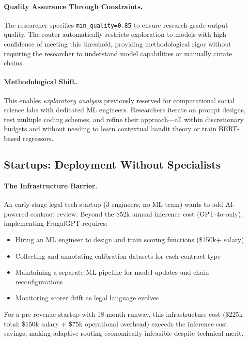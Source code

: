 \paragraph{Quality Assurance Through Constraints.}
The researcher specifies \texttt{min\_quality=0.85} to ensure research-grade output quality. The router automatically restricts exploration to models with high confidence of meeting this threshold, providing methodological rigor without requiring the researcher to understand model capabilities or manually curate chains.

\paragraph{Methodological Shift.} This enables \emph{exploratory analysis} previously reserved for computational social science labs with dedicated ML engineers. Researchers iterate on prompt designs, test multiple coding schemes, and refine their approach---all within discretionary budgets and without needing to learn contextual bandit theory or train BERT-based regressors.

\subsection{Startups: Deployment Without Specialists}

\paragraph{The Infrastructure Barrier.} An early-stage legal tech startup (3 engineers, no ML team) wants to add AI-powered contract review. Beyond the \$52k annual inference cost (GPT-4o-only), implementing FrugalGPT requires:
\begin{itemize}[leftmargin=*,nosep]
    \item Hiring an ML engineer to design and train scoring functions (\$150k+ salary)
    \item Collecting and annotating calibration datasets for each contract type
    \item Maintaining a separate ML pipeline for model updates and chain reconfigurations
    \item Monitoring scorer drift as legal language evolves
\end{itemize}

For a pre-revenue startup with 18-month runway, this infrastructure cost (\$225k total: \$150k salary + \$75k operational overhead) exceeds the inference cost savings, making adaptive routing economically infeasible despite technical merit.

